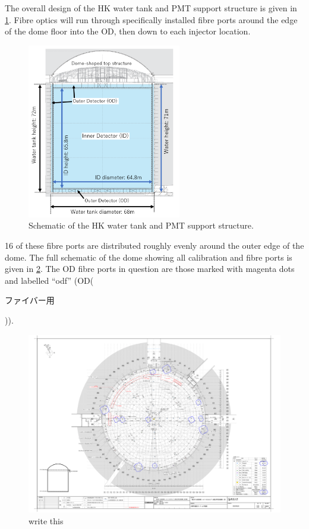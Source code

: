 \documentclass[a4paper,11pt]{article}
\begin{document}
The overall design of the HK water tank and PMT support structure is given in \cref{fig:HKtank}. Fibre optics will run through specifically installed fibre ports around the edge of the dome floor into the OD, then down to each injector location.
\begin{figure}[h]
\centering
\includegraphics[width=0.6\textwidth]{HKdiagram.png}
\caption{Schematic of the HK water tank and PMT support structure. \cite{bib:tn0048}}\label{fig:HKtank}
\end{figure}
16 of these fibre ports are distributed roughly evenly around the outer edge of the dome. The full schematic of the dome showing all calibration and fibre ports is given in \cref{fig:ports}. The OD fibre ports in question are those marked with magenta dots and labelled ``odf'' (OD(\begin{CJK*}{UTF8}{min}ファイバー用\end{CJK*})).
\begin{figure}[h]
\centering
\includegraphics[angle=90,width=\textwidth]{portMap}
\caption{write this}\label{fig:ports}
\end{figure}
\end{document}
